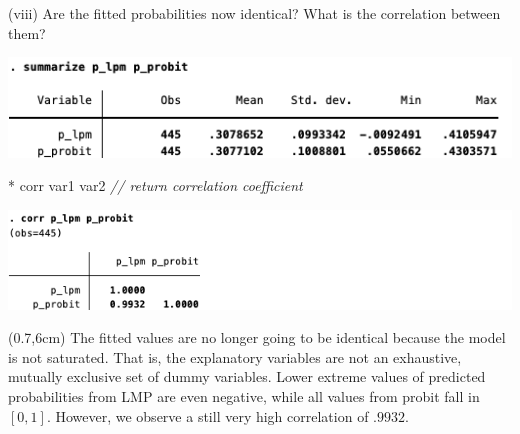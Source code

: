 \documentclass[
  10pt,
  ignorenonframetext,
]{beamer}
\newenvironment{Shaded}{\begin{snugshade}}{\end{snugshade}}
\newcommand{\CommentTok}[1]{\textcolor[rgb]{0.56,0.35,0.01}{\textit{#1}}}
\newcommand{\FunctionTok}[1]{\textcolor[rgb]{0.00,0.00,0.00}{#1}}
\newcommand{\NormalTok}[1]{#1}
\newcommand\MyText[1]{%
  \begin{textblock*}{4.5cm}(0.7\textwidth,6cm)%
    #1
  \end{textblock*}
}
\begin{document}
\begin{frame}[fragile]{(viii) Are the fitted probabilities now
identical? What is the correlation between them?}
\protect\hypertarget{viii-are-the-fitted-probabilities-now-identical-what-is-the-correlation-between-them-1}{}
\begin{center}\includegraphics[width=0.9\linewidth]{pictures/summpredictedvalues} \end{center}

\footnotesize

\begin{Shaded}
\begin{Highlighting}[]
\NormalTok{* }\FunctionTok{corr}\NormalTok{ var1 var2 }\CommentTok{// return correlation coefficient}
\end{Highlighting}
\end{Shaded}

\begin{center}\includegraphics[width=0.9\linewidth]{pictures/corr2predictedvalues} \end{center}

\MyText{\footnotesize The fitted values are no longer going to be identical because the model is not
saturated. That is, the explanatory variables are not an exhaustive, mutually exclusive set of
dummy variables. Lower extreme values of predicted probabilities from LMP are even negative, while all values from probit fall in $[0,1]$. However, we observe a still very high correlation of $.9932$.}
\end{frame}
\end{document}
